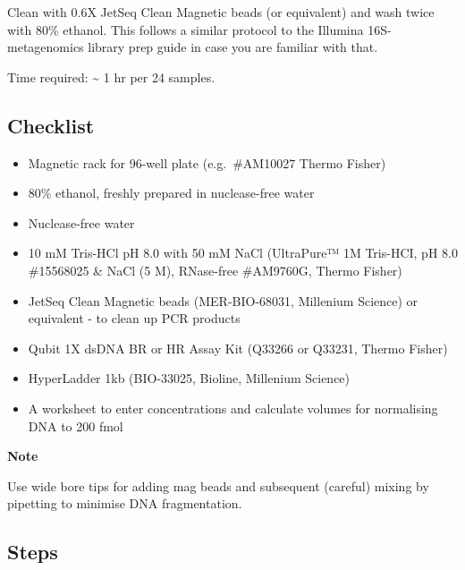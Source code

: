 \documentclass[
]{book}
\providecommand{\tightlist}{%
  \setlength{\itemsep}{0pt}\setlength{\parskip}{0pt}}
\begin{document}
Clean with 0.6X JetSeq Clean Magnetic beads (or equivalent) and wash twice with 80\% ethanol. This follows a similar protocol to the Illumina 16S-metagenomics library prep guide in case you are familiar with that.

Time required: \textasciitilde{} 1 hr per 24 samples.

\subsection{Checklist}\label{checklist-2}

\begin{itemize}
\tightlist
\item
  Magnetic rack for 96-well plate (e.g.~\#AM10027 Thermo Fisher)
\item
  80\% ethanol, freshly prepared in nuclease-free water
\item
  Nuclease-free water
\item
  10 mM Tris-HCl pH 8.0 with 50 mM NaCl (UltraPure™ 1M Tris-HCI, pH 8.0 \#15568025 \& NaCl (5 M), RNase-free \#AM9760G, Thermo Fisher)
\item
  JetSeq Clean Magnetic beads (MER-BIO-68031, Millenium Science) or equivalent - to clean up PCR products
\item
  Qubit 1X dsDNA BR or HR Assay Kit (Q33266 or Q33231, Thermo Fisher)
\item
  HyperLadder 1kb (BIO-33025, Bioline, Millenium Science)
\item
  A worksheet to enter concentrations and calculate volumes for normalising DNA to 200 fmol
\end{itemize}

\textbf{Note}

Use wide bore tips for adding mag beads and subsequent (careful) mixing by pipetting to minimise DNA fragmentation.

\subsection{Steps}\label{steps-1}
\end{document}
